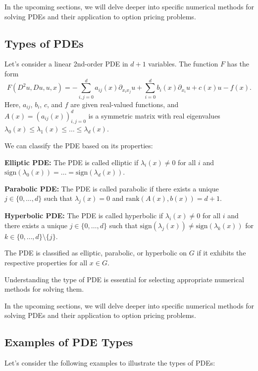 In the upcoming sections, we will delve deeper into specific numerical methods for solving PDEs and their application to option pricing problems.

\subsection{Types of PDEs}

Let's consider a linear 2nd-order PDE in $d + 1$ variables. The function $F$ has the form
\[F(D^2u, Du, u, x) = -\sum_{i,j=0}^d a_{ij}(x) \partial_{x_i x_j} u + \sum_{i=0}^d b_i(x) \partial_{x_i} u + c(x) u - f(x).\]
Here, $a_{ij}$, $b_i$, $c$, and $f$ are given real-valued functions, and $A(x) = (a_{ij}(x))_{i,j=0}^d$ is a symmetric matrix with real eigenvalues $\lambda_0(x) \leq \lambda_1(x) \leq \ldots \leq \lambda_d(x)$.

We can classify the PDE based on its properties:

\textbf{Elliptic PDE:}
The PDE is called elliptic if $\lambda_i(x) \neq 0$ for all $i$ and $\mathrm{sign}(\lambda_0(x)) = \ldots = \mathrm{sign}(\lambda_d(x))$.

\textbf{Parabolic PDE:}
The PDE is called parabolic if there exists a unique $j \in \{0, \ldots, d\}$ such that $\lambda_j(x) = 0$ and $\mathrm{rank}(A(x), b(x)) = d + 1$.

\textbf{Hyperbolic PDE:}
The PDE is called hyperbolic if $\lambda_i(x) \neq 0$ for all $i$ and there exists a unique $j \in \{0, \ldots, d\}$ such that $\mathrm{sign}(\lambda_j(x)) \neq \mathrm{sign}(\lambda_k(x))$ for $k \in \{0, \ldots, d\} \setminus \{j\}$.

The PDE is classified as elliptic, parabolic, or hyperbolic on $G$ if it exhibits the respective properties for all $x \in G$.

Understanding the type of PDE is essential for selecting appropriate numerical methods for solving them.

In the upcoming sections, we will delve deeper into specific numerical methods for solving PDEs and their application to option pricing problems.

\subsection{Examples of PDE Types}

Let's consider the following examples to illustrate the types of PDEs:

